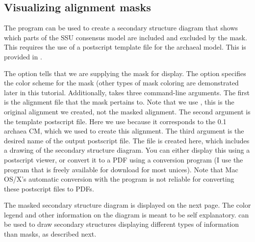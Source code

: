\subsection{Visualizing alignment masks}

The  program can be used to create a secondary
structure diagram that shows which parts of the SSU consensus model
are included and excluded by the mask. This requires the use of a
postscript template file for the archaeal model. This is provided in 
. 


The  option tells  that we are
supplying the mask  for display. The 
option specifies the color scheme for the mask (other types of mask
coloring are demonstrated later in this tutorial. Additionally, 
 takes three command-line arguments. The first is
the alignment file that the mask pertains to. Note that we use
, this is the original alignment we created,
not the masked alignment. The second argument is the template
postscript file. Here we use  because it corresponds
to the  0.1 archaea CM, which we used to create this
alignment. The third argument is the desired name of the output
postscript file. The  file is created here, which
includes a drawing of the secondary structure diagram. You can either
display this using a postscript viewer, or convert it to a PDF using a
conversion program (I use the  program that is freely
available for download for most unices). Note that Mac OS/X's
automatic conversion with the  program is not reliable
for converting these postscript files to PDFs.

The masked secondary structure diagram is displayed on the next page.
The color legend and other information on the diagram is meant to be
self explanatory.  can be used to draw secondary
structures displaying different types of information than masks, as
described next.

\newpage

